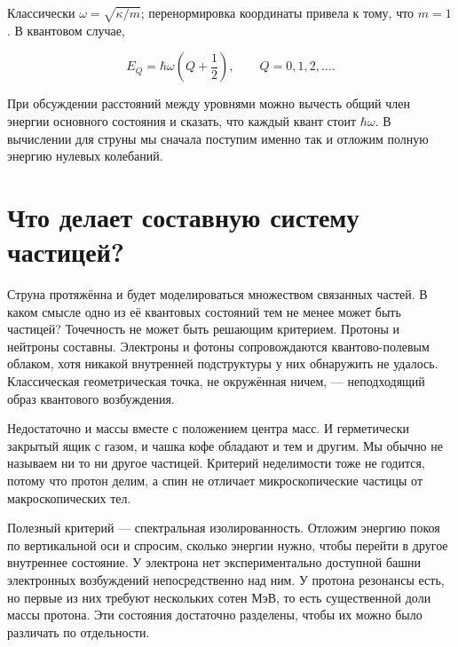 Классически \(\omega=\sqrt{\kappa/m}\); перенормировка координаты привела к тому, что \(m=1\). В квантовом случае,

\begin{equation}
  E_Q=\hbar\omega\left(Q+\frac12\right),
  \qquad Q=0,1,2,\ldots .
  \label{eq:l02-oscillator-spectrum}
\end{equation}

При обсуждении расстояний между уровнями можно вычесть общий член энергии основного состояния и сказать, что каждый квант стоит \(\hbar\omega\). В вычислении для струны мы сначала поступим именно так и отложим полную энергию нулевых колебаний.

\begin{classroomqa}
\end{classroomqa}

\section{Что делает составную систему частицей?}

Струна протяжённа и будет моделироваться множеством связанных частей. В каком смысле одно из её квантовых состояний тем не менее может быть частицей? Точечность не может быть решающим критерием. Протоны и нейтроны составны. Электроны и фотоны сопровождаются квантово-полевым облаком, хотя никакой внутренней подструктуры у них обнаружить не удалось. Классическая геометрическая точка, не окружённая ничем, — неподходящий образ квантового возбуждения.

Недостаточно и массы вместе с положением центра масс. И герметически закрытый ящик с газом, и чашка кофе обладают и тем и другим. Мы обычно не называем ни то ни другое частицей. Критерий неделимости тоже не годится, потому что протон делим, а спин не отличает микроскопические частицы от макроскопических тел.

Полезный критерий — спектральная изолированность. Отложим энергию покоя по вертикальной оси и спросим, сколько энергии нужно, чтобы перейти в другое внутреннее состояние. У электрона нет экспериментально доступной башни электронных возбуждений непосредственно над ним. У протона резонансы есть, но первые из них требуют нескольких сотен МэВ, то есть существенной доли массы протона. Эти состояния достаточно разделены, чтобы их можно было различать по отдельности.

